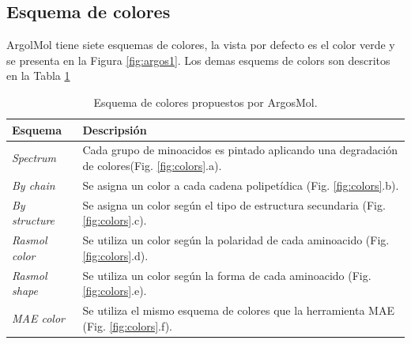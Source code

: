 \documentclass{article}
\begin{document}
\subsection{Esquema de colores}

ArgolMol tiene siete esquemas de colores, la vista por defecto es el color verde y se presenta en la Figura \ref{fig:argos1}. 
Los demas esquems de colors son descritos en la Tabla \ref{tab:color}

\begin{table}[h]

	\begin{tabular}{p{2.1cm} p{12.6cm}}
		\textbf{Esquema} & \textbf{Descripsión}   \\
		\hline 
		\textit{Spectrum} & Cada grupo de minoacidos es pintado aplicando una degradación de colores(Fig. \ref{fig:colors}.a). \\
		\textit{By chain} & Se asigna un color a cada cadena polipetídica (Fig. \ref{fig:colors}.b). \\
		\textit{By structure} & Se asigna un color según el tipo de estructura secundaria (Fig. \ref{fig:colors}.c). \\
		\textit{Rasmol color} & Se utiliza un color según la polaridad de cada aminoacido (Fig. \ref{fig:colors}.d). \\
		\textit{Rasmol shape} & Se utiliza un color según la forma de cada aminoacido (Fig. \ref{fig:colors}.e). \\
		\textit{MAE color} & Se utiliza el mismo esquema de colores que la herramienta MAE (Fig. \ref{fig:colors}.f). \\
		\hline
	\end{tabular}
\caption{Esquema de colores propuestos por ArgosMol.}
\label{tab:color}
\end{table}	
\end{document}
